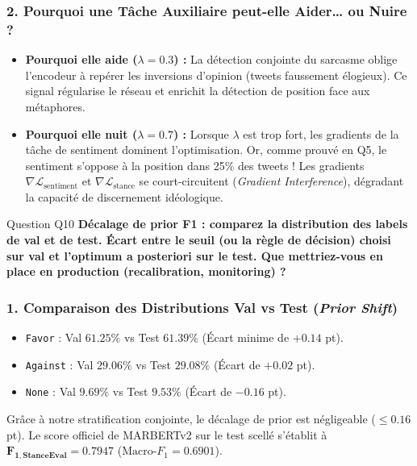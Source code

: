\documentclass[11pt,a4paper]{article}
\begin{document}
\subsubsection*{2. Pourquoi une Tâche Auxiliaire peut-elle Aider… ou Nuire ?}
\begin{itemize}[leftmargin=*]
    \item \textbf{Pourquoi elle aide ($\lambda = 0.3$) :} La détection conjointe du sarcasme oblige l'encodeur à repérer les inversions d'opinion (tweets faussement élogieux). Ce signal régularise le réseau et enrichit la détection de position face aux métaphores.
    \item \textbf{Pourquoi elle nuit ($\lambda = 0.7$) :} Lorsque $\lambda$ est trop fort, les gradients de la tâche de sentiment dominent l'optimisation. Or, comme prouvé en Q5, le sentiment s'oppose à la position dans 25\% des tweets ! Les gradients $\nabla \mathcal{L}_{\text{sentiment}}$ et $\nabla \mathcal{L}_{\text{stance}}$ se court-circuitent (\textit{Gradient Interference}), dégradant la capacité de discernement idéologique.
\end{itemize}

\vspace{0.3cm}

\begin{questionbox}{Question Q10}
\textbf{Décalage de prior F1 : comparez la distribution des labels de val et de test. Écart entre le seuil (ou la règle de décision) choisi sur val et l'optimum a posteriori sur le test. Que mettriez-vous en place en production (recalibration, monitoring) ?}
\end{questionbox}

\subsubsection*{1. Comparaison des Distributions Val vs Test (\textit{Prior Shift})}
\begin{itemize}[noitemsep]
    \item \texttt{Favor} : Val $61.25\%$ vs Test $61.39\%$ (Écart minime de $+0.14$ pt).
    \item \texttt{Against} : Val $29.06\%$ vs Test $29.08\%$ (Écart de $+0.02$ pt).
    \item \texttt{None} : Val $9.69\%$ vs Test $9.53\%$ (Écart de $-0.16$ pt).
\end{itemize}
Grâce à notre stratification conjointe, le décalage de prior est négligeable ($\le 0.16$ pt). Le score officiel de MARBERTv2 sur le test scellé s'établit à $\mathbf{F_{1,\text{StanceEval}} = 0.7947}$ ($\text{Macro-}F_1 = 0.6901$).
\end{document}
